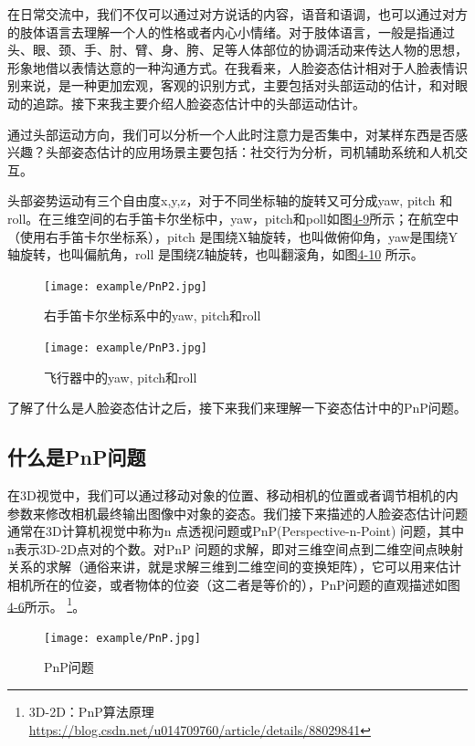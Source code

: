在日常交流中，我们不仅可以通过对方说话的内容，语音和语调，也可以通过对方的肢体语言去理解一个人的性格或者内心小情绪。对于肢体语言，一般是指通过头、眼、颈、手、肘、臂、身、胯、足等人体部位的协调活动来传达人物的思想，形象地借以表情达意的一种沟通方式。在我看来，人脸姿态估计相对于人脸表情识别来说，是一种更加宏观，客观的识别方式，主要包括对头部运动的估计，和对眼动的追踪。接下来我主要介绍人脸姿态估计中的头部运动估计。

通过头部运动方向，我们可以分析一个人此时注意力是否集中，对某样东西是否感兴趣？头部姿态估计的应用场景主要包括：社交行为分析，司机辅助系统和人机交互。

头部姿势运动有三个自由度x,y,z，对于不同坐标轴的旋转又可分成yaw, pitch 和roll。在三维空间的右手笛卡尔坐标中，yaw，pitch和poll如图\href{fig:4-9}{4-9}所示；在航空中（使用右手笛卡尔坐标系），pitch 是围绕X轴旋转，也叫做俯仰角，yaw是围绕Y轴旋转，也叫偏航角，roll 是围绕Z轴旋转，也叫翻滚角，如图\href{fig:4-10}{4-10} 所示。

\begin{figure}[!htp]
\centering
\texttt{[image: example/PnP2.jpg]}
\caption{右手笛卡尔坐标系中的yaw, pitch和roll}
\label{fig1:4-8}
\end{figure}

\begin{figure}[!htp]
\centering
\texttt{[image: example/PnP3.jpg]}
\caption{飞行器中的yaw, pitch和roll}
\label{fig1:4-8}
\end{figure}

了解了什么是人脸姿态估计之后，接下来我们来理解一下姿态估计中的PnP问题。

\subsection{什么是PnP问题}

在3D视觉中，我们可以通过移动对象的位置、移动相机的位置或者调节相机的内参数来修改相机最终输出图像中对象的姿态。我们接下来描述的人脸姿态估计问题通常在3D计算机视觉中称为n 点透视问题或PnP(Perspective-n-Point) 问题，其中n表示3D-2D点对的个数。对PnP 问题的求解，即对三维空间点到二维空间点映射关系的求解（通俗来讲，就是求解三维到二维空间的变换矩阵），它可以用来估计相机所在的位姿，或者物体的位姿（这二者是等价的），PnP问题的直观描述如图\href{fig:4-6}{4-6}所示。
\footnote{3D-2D：PnP算法原理 \quad \url{https://blog.csdn.net/u014709760/article/details/88029841}}。

\begin{figure}[!htp]

\centering
\texttt{[image: example/PnP.jpg]}
\caption{PnP问题}
\label{figure:4-6}
\end{figure}

